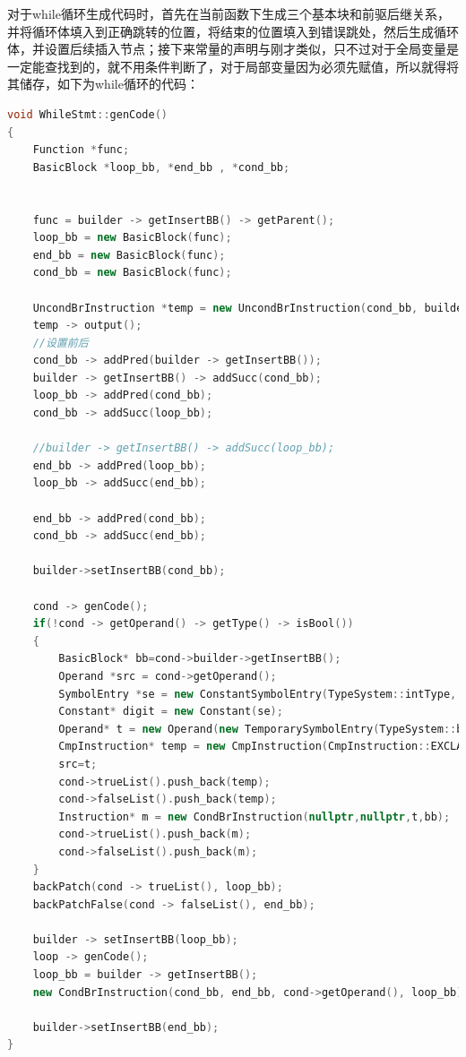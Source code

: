 \documentclass[UTF8,a4paper,10pt]{ctexart}
\begin{document}
对于while循环生成代码时，首先在当前函数下生成三个基本块和前驱后继关系，并将循环体填入到正确跳转的位置，将结束的位置填入到错误跳处，然后生成循环体，并设置后续插入节点；接下来常量的声明与刚才类似，只不过对于全局变量是一定能查找到的，就不用条件判断了，对于局部变量因为必须先赋值，所以就得将其储存，如下为while循环的代码：
\begin{lstlisting}[title = while循环, language = c++]
void WhileStmt::genCode()
{
    Function *func;
    BasicBlock *loop_bb, *end_bb , *cond_bb;


    func = builder -> getInsertBB() -> getParent();
    loop_bb = new BasicBlock(func);
    end_bb = new BasicBlock(func);
    cond_bb = new BasicBlock(func);

    UncondBrInstruction *temp = new UncondBrInstruction(cond_bb, builder -> getInsertBB());
    temp -> output();
    //设置前后
    cond_bb -> addPred(builder -> getInsertBB());
    builder -> getInsertBB() -> addSucc(cond_bb);
    loop_bb -> addPred(cond_bb);
    cond_bb -> addSucc(loop_bb);

    //builder -> getInsertBB() -> addSucc(loop_bb);
    end_bb -> addPred(loop_bb);
    loop_bb -> addSucc(end_bb);

    end_bb -> addPred(cond_bb);
    cond_bb -> addSucc(end_bb);

    builder->setInsertBB(cond_bb);

    cond -> genCode();
    if(!cond -> getOperand() -> getType() -> isBool())
    {
        BasicBlock* bb=cond->builder->getInsertBB();
        Operand *src = cond->getOperand();
        SymbolEntry *se = new ConstantSymbolEntry(TypeSystem::intType, 0);
        Constant* digit = new Constant(se);
        Operand* t = new Operand(new TemporarySymbolEntry(TypeSystem::boolType, SymbolTable::getLabel()));
        CmpInstruction* temp = new CmpInstruction(CmpInstruction::EXCLAMATION, t, src, digit->getOperand(), bb);
        src=t;
        cond->trueList().push_back(temp);
        cond->falseList().push_back(temp);
        Instruction* m = new CondBrInstruction(nullptr,nullptr,t,bb);
        cond->trueList().push_back(m);
        cond->falseList().push_back(m);
    }
    backPatch(cond -> trueList(), loop_bb);
    backPatchFalse(cond -> falseList(), end_bb);

    builder -> setInsertBB(loop_bb);
    loop -> genCode();
    loop_bb = builder -> getInsertBB();
    new CondBrInstruction(cond_bb, end_bb, cond->getOperand(), loop_bb);

    builder->setInsertBB(end_bb);
}
\end{lstlisting}
\end{document}
